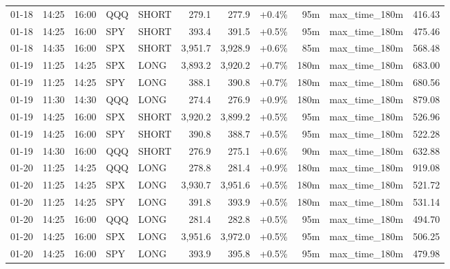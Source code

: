 \documentclass[11pt,a4paper,twoside]{article}
\begin{document}
\begin{center}
\begin{longtable}{>{\color{txtmain}}l l l l l r r r r >{\color{txtmain}}l r}
01-18 & 14:25 & 16:00 & QQQ & SHORT & 279.1 & 277.9 & \textcolor{wingreen}{+0.4\%} & 95m & max\_time\_180m & \textcolor{wingreen}{416.43} \\
01-18 & 14:25 & 16:00 & SPY & SHORT & 393.4 & 391.5 & \textcolor{wingreen}{+0.5\%} & 95m & max\_time\_180m & \textcolor{wingreen}{475.46} \\
01-18 & 14:35 & 16:00 & SPX & SHORT & 3,951.7 & 3,928.9 & \textcolor{wingreen}{+0.6\%} & 85m & max\_time\_180m & \textcolor{wingreen}{568.48} \\
01-19 & 11:25 & 14:25 & SPX & LONG & 3,893.2 & 3,920.2 & \textcolor{wingreen}{+0.7\%} & 180m & max\_time\_180m & \textcolor{wingreen}{683.00} \\
01-19 & 11:25 & 14:25 & SPY & LONG & 388.1 & 390.8 & \textcolor{wingreen}{+0.7\%} & 180m & max\_time\_180m & \textcolor{wingreen}{680.56} \\
01-19 & 11:30 & 14:30 & QQQ & LONG & 274.4 & 276.9 & \textcolor{wingreen}{+0.9\%} & 180m & max\_time\_180m & \textcolor{wingreen}{879.08} \\
01-19 & 14:25 & 16:00 & SPX & SHORT & 3,920.2 & 3,899.2 & \textcolor{wingreen}{+0.5\%} & 95m & max\_time\_180m & \textcolor{wingreen}{526.96} \\
01-19 & 14:25 & 16:00 & SPY & SHORT & 390.8 & 388.7 & \textcolor{wingreen}{+0.5\%} & 95m & max\_time\_180m & \textcolor{wingreen}{522.28} \\
01-19 & 14:30 & 16:00 & QQQ & SHORT & 276.9 & 275.1 & \textcolor{wingreen}{+0.6\%} & 90m & max\_time\_180m & \textcolor{wingreen}{632.88} \\
01-20 & 11:25 & 14:25 & QQQ & LONG & 278.8 & 281.4 & \textcolor{wingreen}{+0.9\%} & 180m & max\_time\_180m & \textcolor{wingreen}{919.08} \\
01-20 & 11:25 & 14:25 & SPX & LONG & 3,930.7 & 3,951.6 & \textcolor{wingreen}{+0.5\%} & 180m & max\_time\_180m & \textcolor{wingreen}{521.72} \\
01-20 & 11:25 & 14:25 & SPY & LONG & 391.8 & 393.9 & \textcolor{wingreen}{+0.5\%} & 180m & max\_time\_180m & \textcolor{wingreen}{531.14} \\
01-20 & 14:25 & 16:00 & QQQ & LONG & 281.4 & 282.8 & \textcolor{wingreen}{+0.5\%} & 95m & max\_time\_180m & \textcolor{wingreen}{494.70} \\
01-20 & 14:25 & 16:00 & SPX & LONG & 3,951.6 & 3,972.0 & \textcolor{wingreen}{+0.5\%} & 95m & max\_time\_180m & \textcolor{wingreen}{506.25} \\
01-20 & 14:25 & 16:00 & SPY & LONG & 393.9 & 395.8 & \textcolor{wingreen}{+0.5\%} & 95m & max\_time\_180m & \textcolor{wingreen}{479.98} \\

\end{longtable}
\end{center}
\end{document}
